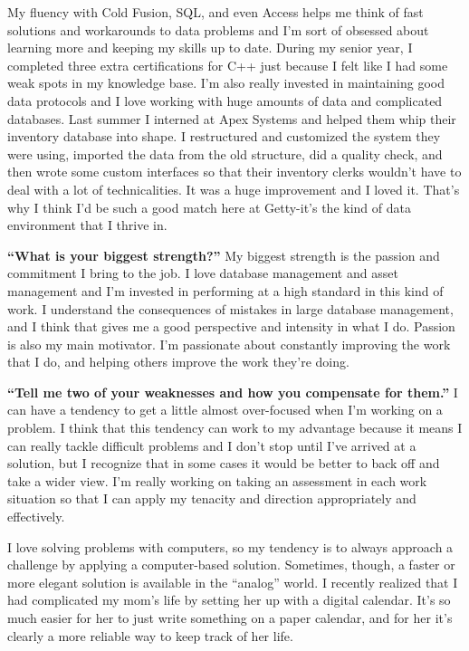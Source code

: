 My fluency with Cold Fusion, SQL, and even Access helps me think of fast solutions and workarounds to data problems and I'm sort of obsessed about learning more and keeping my skills up to date. During my senior year, I completed three extra certifications for C++ just because I felt like I had some weak spots in my knowledge base. I'm also really invested in maintaining good data protocols and I love working with huge amounts of data and complicated databases. Last summer I interned at Apex Systems and helped them whip their inventory database into shape. I restructured and customized the system they were using, imported the data from the old structure, did a quality check, and then wrote some custom interfaces so that their inventory clerks wouldn't have to deal with a lot of technicalities. It was a huge improvement and I loved it. That's why I think I'd be such a good match here at Getty-it's the kind of data environment that I thrive in.

\textbf{``What is your biggest strength?''}
\break My biggest strength is the passion and commitment I bring to the job. I love database management and asset management and I'm invested in performing at a high standard in this kind of work. I understand the consequences of mistakes in large database management, and I think that gives me a good perspective and intensity in what I do. Passion is also my main motivator. I'm passionate about constantly improving the work that I do, and helping others improve the work they're doing.

\textbf{``Tell me two of your weaknesses and how you compensate for them.''}
\break I can have a tendency to get a little almost over-focused when I'm working on a problem. I think that this tendency can work to my advantage because it means I can really tackle difficult problems and I don't stop until I've arrived at a solution, but I recognize that in some cases it would be better to back off and take a wider view. I'm really working on taking an assessment in each work situation so that I can apply my tenacity and direction appropriately and effectively.

I love solving problems with computers, so my tendency is to always approach a challenge by applying a computer-based solution. Sometimes, though, a faster or more elegant solution is available in the ``analog'' world. I recently realized that I had complicated my mom's life by setting her up with a digital calendar. It's so much easier for her to just write something on a paper calendar, and for her it's clearly a more reliable way to keep track of her life.

